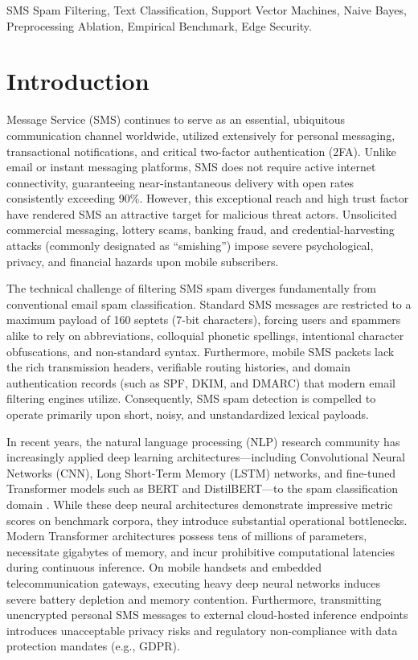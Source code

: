 \documentclass[conference]{IEEEtran}
\begin{document}
\begin{IEEEkeywords}
SMS Spam Filtering, Text Classification, Support Vector Machines, Naive Bayes, Preprocessing Ablation, Empirical Benchmark, Edge Security.
\end{IEEEkeywords}

\section{Introduction}
 Message Service (SMS) continues to serve as an essential, ubiquitous communication channel worldwide, utilized extensively for personal messaging, transactional notifications, and critical two-factor authentication (2FA). Unlike email or instant messaging platforms, SMS does not require active internet connectivity, guaranteeing near-instantaneous delivery with open rates consistently exceeding 90\%. However, this exceptional reach and high trust factor have rendered SMS an attractive target for malicious threat actors. Unsolicited commercial messaging, lottery scams, banking fraud, and credential-harvesting attacks (commonly designated as ``smishing'') impose severe psychological, privacy, and financial hazards upon mobile subscribers.

The technical challenge of filtering SMS spam diverges fundamentally from conventional email spam classification. Standard SMS messages are restricted to a maximum payload of 160 septets (7-bit characters), forcing users and spammers alike to rely on abbreviations, colloquial phonetic spellings, intentional character obfuscations, and non-standard syntax. Furthermore, mobile SMS packets lack the rich transmission headers, verifiable routing histories, and domain authentication records (such as SPF, DKIM, and DMARC) that modern email filtering engines utilize. Consequently, SMS spam detection is compelled to operate primarily upon short, noisy, and unstandardized lexical payloads.

In recent years, the natural language processing (NLP) research community has increasingly applied deep learning architectures---including Convolutional Neural Networks (CNN), Long Short-Term Memory (LSTM) networks, and fine-tuned Transformer models such as BERT and DistilBERT---to the spam classification domain \cite{roy2020deep, ghourabi2020hybrid, alsaidat2024advancements}. While these deep neural architectures demonstrate impressive metric scores on benchmark corpora, they introduce substantial operational bottlenecks. Modern Transformer architectures possess tens of millions of parameters, necessitate gigabytes of memory, and incur prohibitive computational latencies during continuous inference. On mobile handsets and embedded telecommunication gateways, executing heavy deep neural networks induces severe battery depletion and memory contention. Furthermore, transmitting unencrypted personal SMS messages to external cloud-hosted inference endpoints introduces unacceptable privacy risks and regulatory non-compliance with data protection mandates (e.g., GDPR).
\end{document}
